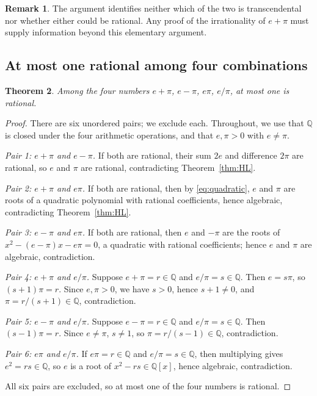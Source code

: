 \documentclass[11pt]{amsart}
\newtheorem{theorem}{Theorem}[section]
\theoremstyle{definition}
\newtheorem{remark}[theorem]{Remark}
\theoremstyle{remark}
\numberwithin{equation}{section}
\newcommand{\Q}{\mathbb{Q}}
\begin{document}
\begin{remark}
The argument identifies neither which of the two is transcendental nor whether either could be rational. Any proof of the irrationality of $e+\pi$ must supply information beyond this elementary argument.
\end{remark}

\subsection{At most one rational among four combinations}

\begin{theorem}\label{thm:four}
Among the four numbers $e+\pi$, $e-\pi$, $e\pi$, $e/\pi$, at most one is rational.
\end{theorem}

\begin{proof}
There are six unordered pairs; we exclude each. Throughout, we use that $\Q$ is closed under the four arithmetic operations, and that $e,\pi>0$ with $e\ne\pi$.

\emph{Pair 1: $e+\pi$ and $e-\pi$.} If both are rational, their sum $2e$ and difference $2\pi$ are rational, so $e$ and $\pi$ are rational, contradicting Theorem~\ref{thm:HL}.

\emph{Pair 2: $e+\pi$ and $e\pi$.} If both are rational, then by \eqref{eq:quadratic}, $e$ and $\pi$ are roots of a quadratic polynomial with rational coefficients, hence algebraic, contradicting Theorem~\ref{thm:HL}.

\emph{Pair 3: $e-\pi$ and $e\pi$.} If both are rational, then $e$ and $-\pi$ are the roots of $x^2-(e-\pi)x-e\pi=0$, a quadratic with rational coefficients; hence $e$ and $\pi$ are algebraic, contradiction.

\emph{Pair 4: $e+\pi$ and $e/\pi$.} Suppose $e+\pi=r\in\Q$ and $e/\pi=s\in\Q$. Then $e=s\pi$, so $(s+1)\pi=r$. Since $e,\pi>0$, we have $s>0$, hence $s+1\ne0$, and $\pi=r/(s+1)\in\Q$, contradiction.

\emph{Pair 5: $e-\pi$ and $e/\pi$.} Suppose $e-\pi=r\in\Q$ and $e/\pi=s\in\Q$. Then $(s-1)\pi=r$. Since $e\ne\pi$, $s\ne1$, so $\pi=r/(s-1)\in\Q$, contradiction.

\emph{Pair 6: $e\pi$ and $e/\pi$.} If $e\pi=r\in\Q$ and $e/\pi=s\in\Q$, then multiplying gives $e^2=rs\in\Q$, so $e$ is a root of $x^2-rs\in\Q[x]$, hence algebraic, contradiction.

All six pairs are excluded, so at most one of the four numbers is rational.
\end{proof}
\end{document}
